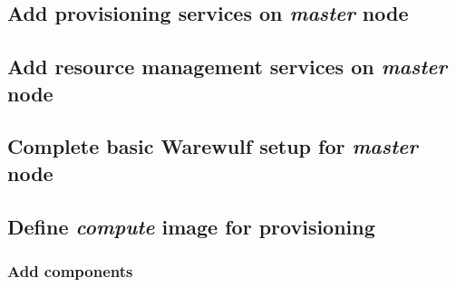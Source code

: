 \documentclass[letterpaper]{article}
\begin{document}
\subsection{Add provisioning services on {\em master} node} \label{sec:add_provisioning}




\subsection{Add resource management services on {\em master} node} \label{sec:add_rm}



\subsection{Complete basic Warewulf setup for {\em master} node} \label{sec:setup_ww}



\subsection{Define {\em compute} image for provisioning}


\subsubsection{Add \OHPC{} components} \label{sec:add_components}

\end{document}
